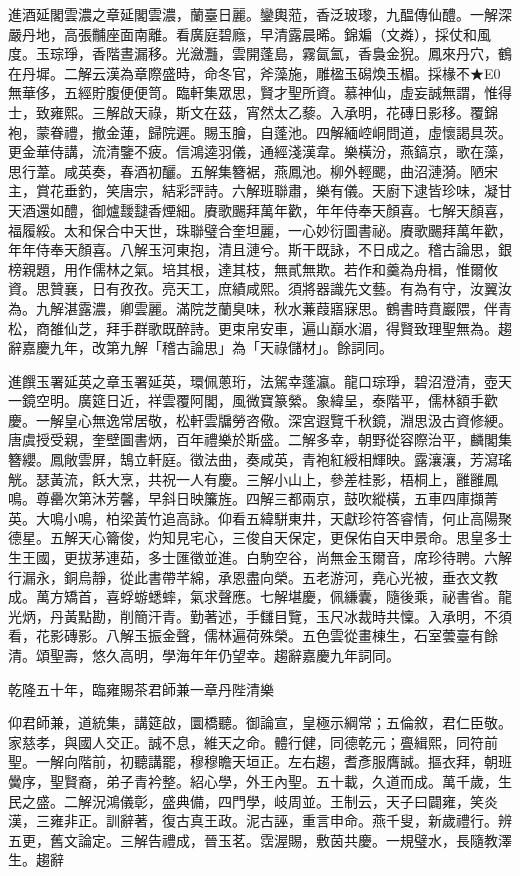 \begin{pinyinscope}
進酒延閣雲濃之章延閣雲濃，蘭臺日麗。鑾輿蒞，香泛玻瓈，九醖傳仙醴。一解深嚴丹地，高張黼座面南離。看廣庭碧廕，早清露晨晞。錦斒（文粦），採仗和風度。玉琮琤，香階晝漏移。光瀲灩，雲開蓬島，霧氤氳，香裊金猊。鳳來丹穴，鶴在丹墀。二解云漢為章際盛時，命冬官，斧藻施，雕楹玉磶煥玉楣。採椽不★E0無華侈，五經貯腹便便笥。臨軒集眾思，賢才聖所資。慕神仙，虛妄誠無謂，惟得士，致雍熙。三解啟天祿，斯文在茲，宵然太乙藜。入承明，花磚日影移。覆錦袍，蒙眷禮，撤金蓮，歸院遲。賜玉膾，自蓬池。四解緬崆峒問道，虛懷謁具茨。更金華侍講，流清鑒不疲。信鴻逵羽儀，通經淺漢韋。樂橫汾，燕鎬京，歌在藻，思行葦。咸英奏，春酒初釃。五解集簪裾，燕鳳池。柳外輕颸，曲沼漣漪。陋宋主，賞花垂釣，笑唐宗，結彩評詩。六解班聯肅，樂有儀。天廚下逮皆珍味，凝甘天酒還如醴，御爐靉靆香煙細。賡歌颺拜萬年歡，年年侍奉天顏喜。七解天顏喜，福履綏。太和保合中天世，珠聯璧合奎坦麗，一心妙衍圖書祕。賡歌颺拜萬年歡，年年侍奉天顏喜。八解玉河東抱，清且漣兮。斯干既詠，不日成之。稽古論思，銀榜親題，用作儒林之氣。培其根，達其枝，無貳無欺。若作和羹為舟楫，惟爾攸資。思贊襄，日有孜孜。亮天工，庶績咸熙。須將器識先文藝。有為有守，汝翼汝為。九解湛露濃，卿雲麗。滿院芝蘭臭味，秋水蒹葭寤寐思。鶴書時賁巖隈，伴青松，商雒仙芝，拜手群歌既醉詩。更束帛安車，遍山巔水湄，得賢致理聖無為。趨辭嘉慶九年，改第九解「稽古論思」為「天祿儲材」。餘詞同。

進饌玉署延英之章玉署延英，環佩蔥珩，法駕幸蓬瀛。龍口琮琤，碧沼澄清，壺天一鏡空明。廣筵日近，祥雲覆阿閣，風微寶篆縈。象緯呈，泰階平，儒林額手歡慶。一解皇心無逸常居敬，松軒雲牖勞咨儆。深宮遐覽千秋鏡，淵思汲古資修綆。唐虞授受親，奎壁圖書炳，百年禮樂於斯盛。二解多幸，朝野從容際治平，麟閣集簪纓。鳳敞雲屏，鵠立軒庭。徵法曲，奏咸英，青袍紅綬相輝映。露瀼瀼，芳瀉瑤觥。瑟黃流，飫大烹，共祝一人有慶。三解小山上，參差桂影，梧桐上，雝雝鳳鳴。尊罍次第沐芳馨，早斜日映簾旌。四解三都兩京，鼓吹縱橫，五車四庫擷菁英。大鳴小鳴，柏梁黃竹追高詠。仰看五緯駢東井，天獻珍符答睿情，何止高陽聚德星。五解天心籥俊，灼知見宅心，三俊自天保定，更保佑自天申景命。思皇多士生王國，更拔茅連茹，多士匯徵並進。白駒空谷，尚無金玉爾音，席珍待聘。六解行漏永，銅烏靜，從此書帶芊綿，承恩盡向榮。五老游河，堯心光被，垂衣文教成。萬方矯首，喜蜉蝣蟋蟀，氣求聲應。七解堪慶，佩縑囊，隨後乘，祕書省。龍光炳，丹黃點勘，削簡汗青。勤著述，手讎目覽，玉尺冰裁時共懍。入承明，不須看，花影磚影。八解玉振金聲，儒林遍荷殊榮。五色雲從畫棟生，石室蕓臺有餘清。頌聖壽，悠久高明，學海年年仍望幸。趨辭嘉慶九年詞同。

乾隆五十年，臨雍賜茶君師兼一章丹陛清樂

仰君師兼，道統集，講筵啟，圜橋聽。御論宣，皇極示綱常；五倫敘，君仁臣敬。家慈孝，與國人交正。誠不息，維天之命。體行健，同德乾元；亹緝熙，同符前聖。一解向階前，初聽講罷，穆穆瞻天垣正。左右趨，耆彥服膺誠。摳衣拜，朝班黌序，聖賢裔，弟子青衿整。紹心學，外王內聖。五十載，久道而成。萬千歲，生民之盛。二解況鴻儀彰，盛典備，四門學，岐周並。王制云，天子曰闢雍，笑炎漢，三雍非正。訓辭著，復古真王政。泥古誣，重言申命。燕千叟，新歲禮行。辨五更，舊文論定。三解告禮成，晉玉茗。霑渥賜，敷茵共慶。一規璧水，長隨教澤生。趨辭


\end{pinyinscope}
